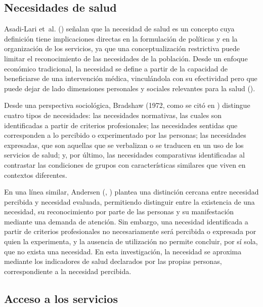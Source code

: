 \documentclass[
  spanish,
  a4paper,
  oneside]{scrbook}
\begin{document}
\subsection{Necesidades de salud}\label{necesidades-de-salud}

Asadi-Lari et~al. () señalan
que la necesidad de salud es un concepto cuya definición tiene
implicaciones directas en la formulación de políticas y en la
organización de los servicios, ya que una conceptualización restrictiva
puede limitar el reconocimiento de las necesidades de la población.
Desde un enfoque económico tradicional, la necesidad se define a partir
de la capacidad de beneficiarse de una intervención médica, vinculándola
con su efectividad pero que puede dejar de lado dimensiones personales y
sociales relevantes para la salud
().

Desde una perspectiva sociológica, Bradshaw (1972, como se citó en
) distingue
cuatro tipos de necesidades: las necesidades normativas, las cuales son
identificadas a partir de criterios profesionales; las necesidades
sentidas que corresponden a lo percibido o experimentado por las
personas; las necesidades expresadas, que son aquellas que se verbalizan
o se traducen en un uso de los servicios de salud; y, por último, las
necesidades comparativas identificadas al contrastar las condiciones de
grupos con características similares que viven en contextos diferentes.

En una línea similar, Andersen
(,
) plantea una distinción
cercana entre necesidad percibida y necesidad evaluada, permitiendo
distinguir entre la existencia de una necesidad, su reconocimiento por
parte de las personas y su manifestación mediante una demanda de
atención. Sin embargo, una necesidad identificada a partir de criterios
profesionales no necesariamente será percibida o expresada por quien la
experimenta, y la ausencia de utilización no permite concluir, por sí
sola, que no exista una necesidad. En esta investigación, la necesidad
se aproxima mediante los indicadores de salud declarados por las propias
personas, correspondiente a la necesidad percibida.

\subsection{Acceso a los servicios}\label{acceso-a-los-servicios}
\end{document}
